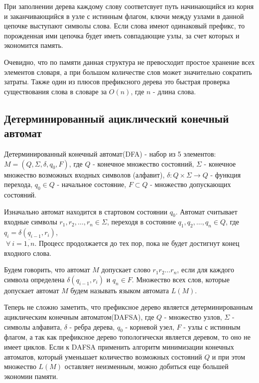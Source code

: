 \documentclass[12pt, a4paper]{article}
\begin{document}
При заполнении дерева каждому слову соответсвует путь начинающийся из корня и заканчивающийся в узле с истинным флагом, ключи между узлами в данной цепочке выступают символы слова. Если слова имеют одинаковый префикс, то порожденная ими цепочка будет иметь совпадающие узлы, за счет которых и экономится память.

\begin{figure}[htp]
\label{ris:Prefix_Trie.png}
\end{figure}

Очевидно, что по памяти данная структура не превосходит простое хранение всех элементов словаря, а при большом количестве слов может значительно сократить затраты. Также один из плюсов префиксного дерева это быстрая проверка существования слова в словаре за $O(n)$, где $n$ - длина слова.

\subsection{Детерминированный ациклический конечный автомат}
\quad Детерминированный конечный автомат(DFA) - набор из 5 элементов: $M = (Q, \Sigma, \delta, q_0, F)$, где $Q$ - конечное множество состояний, $\Sigma$ - конечное множество возможных входных символов (алфавит), $\delta: Q \times \Sigma \longrightarrow Q$ - функция перехода, $q_0 \in Q$ - начальное состояние, $F \subset Q$ - множество допускающих состояний.

Изначально автомат находится в стартовом состоянии $q_0$. Автомат считывает входные символы  
$r_1, r_2, \dots, r_n \in \Sigma$, переходя в состояние $q_1, q_2, \dots, q_n \in Q$, где $q_i = \delta(q_{i-1}, r_i)$, \\ $\; \forall \: i = \overline{1, n}$. Процесс продолжается до тех пор, пока не будет достигнут конец входного слова.

Будем говорить, что автомат $M$ допускает слово $r_1 r_2\dots r_n$, если для каждого символа определена $\delta(q_{i-1}, r_i)$ и $q_n \in F$. Множество всех слов, которые допускает автомат $M$ будем называть языком автомата $L(M)$.

Теперь не сложно заметить, что префиксное дерево является детерминированным ациклическим конечным автоматом(DAFSA), где $Q$ - множество узлов, $\Sigma$ - символы алфавита, $\delta$ - ребра дерева, $q_0$ - корневой узел, $F$ - узлы с истинным флагом, а так как префиксное дерево топологически является деревом, то оно не имеет циклов. Если к DAFSA применить алгоритм минимизации конечных автоматов, который уменьшает количество возможных состояний $Q$ и при этом множество $L(M)$ оставляет неизменным, можно добиться еще большей экономии памяти.
\end{document}
